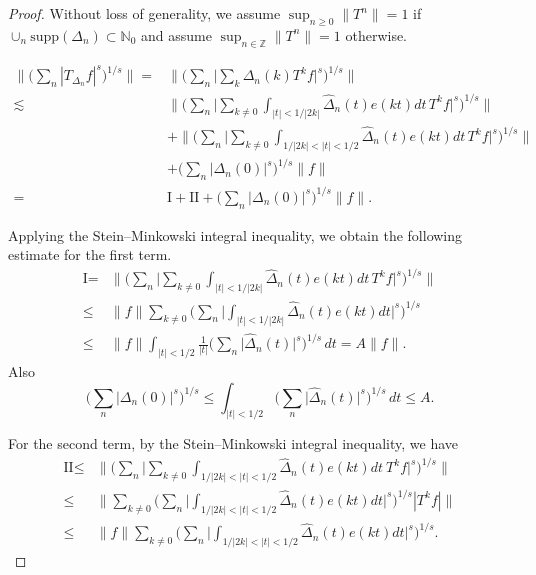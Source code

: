 \documentclass[10pt,a4paper]{amsart}
\begin{document}
\begin{proof}
Without loss of generality, we assume $\sup_{n\ge 0} \lVert T^n \rVert = 1$ if $\cup_n \mbox{supp}(\Delta_n) \subset \mathbb N_0$ and  assume $\sup_{n\in \mathbb Z} \lVert T^n \rVert = 1$ otherwise.

\begin{align*}   \Big\lVert \Big( \sum_n |T_{\Delta_n}f|^s \Big)^{1/s} \Big\rVert
= & \Big\lVert \Big(\sum_n  \Big| \sum_k \Delta_n(k) T^kf\Big|^{s} \Big)^{1/s} \Big\rVert \\
\lesssim &   \Big\lVert   \Big( \sum_n  \Big|  \sum_{k\neq 0} \int_{|t|<1/|2k| } \hat \Delta_n(t) e(kt) dt  \,  T^kf \Big|^{s} \Big)^{1/s} \Big\rVert \\
 & +  \Big\lVert    \Big( \sum_n  \Big|  \sum_{k\neq 0}   \int_{1/|2k|<|t|<1/2} \hat \Delta_n(t) e(kt) dt  \,  T^kf \Big|^{s} \Big)^{1/s} \Big\rVert \\
& +     \Big( \sum_n  \Big|   \Delta_n(0)   \Big|^{s} \Big)^{1/s} \Big\lVert f \Big\rVert \\
 =  &  \mbox{I} + \mbox{II}+   \Big( \sum_n  \big|   \Delta_n(0)   \big|^{s} \Big)^{1/s} \Big\lVert f \Big\rVert.
\end{align*}



Applying the Stein--Minkowski integral inequality, we obtain the following estimate 
for the first term.
\begin{align*}
  \mbox{I} 
=  & \Big\lVert   \Big( \sum_n  \Big|  \sum_{k\neq 0} \int_{|t|<1/|2k|} \hat \Delta_n(t) e(kt) dt  \,  T^kf\Big|^{s} \Big)^{1/s} \Big\rVert \\
\le &  \lVert f\rVert \sum_{k\neq 0} \Big( \sum_n \Big|   \int_{|t|<1/ |2k| } \hat \Delta_n(t) e(kt) dt   \Big|^{s} \Big)^{1/s}\\
\le &   \lVert f\rVert \int_{|t|<1/2} \frac1{|t|}  \Big( \sum_n  \Big| \hat \Delta_n(t) \Big|^s \Big)^{1/s}  \, dt
= A \lVert f\rVert.
  \end{align*}
  Also 
\[ \Big( \sum_n  \big|   \Delta_n(0)   \big|^{s} \Big)^{1/s} \le  \int_{|t|<1/2} \Big( \sum_n  \Big| \hat \Delta_n(t) \Big|^s \Big)^{1/s}  \, dt
\le A.\]

For the second term, by the Stein--Minkowski integral inequality, we have
\begin{align*}
\mbox{II} \le & \Big\lVert   \Big( \sum_n  \Big|  \sum_{k\neq 0}   \int_{1/|2k| <|t|<1/2} \hat \Delta_n(t) e(kt) dt  \  T^kf \Big|^{s} \Big)^{1/s} \Big\rVert \\
\le & \Big\lVert  \sum_{k\neq 0}  \Big( \sum_n  \Big |  \int_{1/|2k|<|t|<1/2} \hat \Delta_n(t) e(kt) dt \Big |^s \Big)^{1/s} |T^kf | \Big\rVert\\
\le & \lVert f\rVert  \sum_{k\neq 0}  \Big( \sum_n  \Big |  \int_{1/|2k|<|t|<1/2} \hat \Delta_n(t) e(kt) dt \Big |^s \Big)^{1/s}.
\end{align*}


\end{proof}
\end{document}
